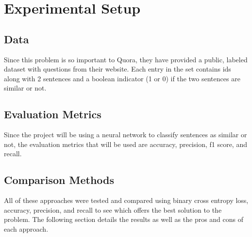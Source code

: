 \documentclass{article}
\begin{document}
\section{Experimental Setup}

\subsection{Data}
Since this problem is so important to Quora, they have provided a public, labeled dataset with questions from their website. Each entry in the set contains ids along with 2 sentences and a boolean indicator (1 or 0) if the two sentences are similar or not.
\subsection{Evaluation Metrics}
Since the project will be using a neural network to classify sentences as similar or not, the evaluation metrics that will be used are accuracy, precision, f1 score, and recall.
\subsection{Comparison Methods}
All of these approaches were tested and compared using binary cross entropy loss, accuracy, precision, and recall to see which offers the best solution to the problem. The following section details the results as well as the pros and cons of each approach.
\end{document}
